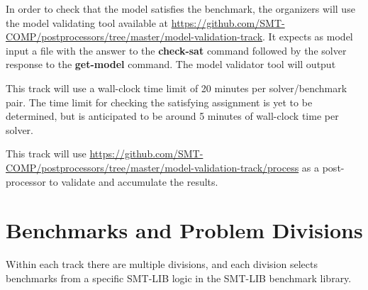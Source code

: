 \documentclass[12pt]{article}
\newcommand{\akey}[1]{\textbf{#1}\xspace}
\begin{document}
In order to check that the model satisfies the benchmark, the organizers will
use the model validating tool available at
{\url{https://github.com/SMT-COMP/postprocessors/tree/master/model-validation-track}}.
It expects as model input a file with the answer to the \akey{check-sat}
command followed by the solver response to the \akey{get-model} command.
The model validator tool will output

This track will use a wall-clock time limit of 20 minutes per solver/benchmark
pair. The time limit for checking the satisfying assignment is yet to be
determined, but is anticipated to be around 5 minutes of wall-clock time per
solver.

This track will use
{\url{https://github.com/SMT-COMP/postprocessors/tree/master/model-validation-track/process}}
as a post-processor
to validate and accumulate the results.


\section{Benchmarks and Problem Divisions}

Within each track there are multiple divisions, and each division selects
benchmarks from a specific SMT-LIB logic in the SMT-LIB benchmark library.
\end{document}
